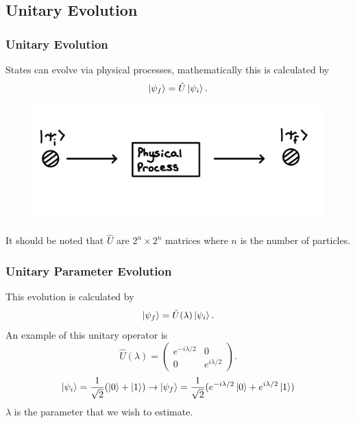 \documentclass{beamer}
\begin{document}
\subsection{\tiny{Unitary Evolution}}
\begin{frame}
\frametitle{Unitary Evolution}
States can evolve via physical processes, mathematically this is calculated by
\begin{equation}\label{eq:10}
\ket{\psi_f}=\hat{U}\ket{\psi_i}.
\end{equation}
\begin{figure}
\begin{center}
\includegraphics[width=0.75\linewidth]{Unitary-Operator.PNG}
\end{center}
\end{figure}
It should be noted that $\hat{U}$ are $2^n\times2^n$ matrices where $n$ is the number of particles.
\end{frame}
\begin{frame}
\frametitle{Unitary Parameter Evolution}
This evolution is calculated by
\begin{equation}\label{eq:11}
\ket{\psi_f}=\hat{U}(\lambda)\ket{\psi_i}.
\end{equation}
An example of this unitary operator is
\begin{equation}\label{eq:12}
\hat{U}(\lambda)=
\begin{pmatrix}
e^{-i\lambda/2} & 0 \\
0 & e^{i\lambda/2}
\end{pmatrix}.
\end{equation}
\begin{equation}\label{eq:13}
\ket{\psi_i}=\frac{1}{\sqrt{2}}(\ket{0}+\ket{1}) \rightarrow \ket{\psi_f}=\frac{1}{\sqrt{2}}(e^{-i\lambda/2}\ket{0}+e^{i\lambda/2}\ket{1})
\end{equation}
$\lambda$ is the parameter that we wish to estimate.
\end{frame}
\end{document}
